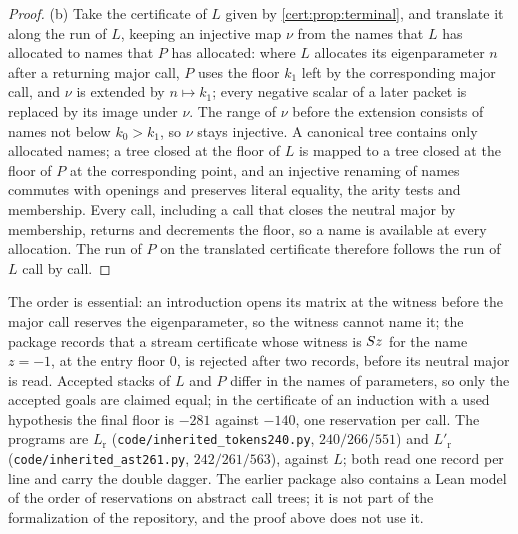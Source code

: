\begin{proof}
(b) Take the certificate of $L$ given by \cref{cert:prop:terminal}, and translate
it along the run of $L$, keeping an injective map $\nu$ from the names that $L$
has allocated to names that $P$ has allocated: where $L$ allocates its
eigenparameter $n$ after a returning major call, $P$ uses the floor $k_1$ left
by the corresponding major call, and $\nu$ is extended by $n\mapsto k_1$; every
negative scalar of a later packet is replaced by its image under $\nu$. The
range of $\nu$ before the extension consists of names not below $k_0>k_1$, so
$\nu$ stays injective. A canonical tree contains only allocated names; a tree
closed at the floor of $L$ is mapped to a tree closed at the floor of $P$ at the
corresponding point, and an injective renaming of names commutes with openings
and preserves literal equality, the arity tests and membership. Every call,
including a call that closes the neutral major by membership, returns and
decrements the floor, so a name is available at every allocation. The run of
$P$ on the translated certificate therefore follows the run of $L$ call by call.
\end{proof}

The order is essential: an introduction opens its matrix at the witness before
the major call reserves the eigenparameter, so the witness cannot name it; the
package records that a stream certificate whose witness is $S z$ for the name
$z=-1$, at the entry floor $0$, is rejected after two records, before its neutral
major is read. Accepted stacks of $L$ and $P$ differ in the
names of parameters, so only the accepted goals are claimed equal; in the
certificate of an induction with a used hypothesis the final floor is $-281$
against $-140$, one reservation per call. The programs are $L_{\mathrm r}$
(\texttt{code/inherited\_tokens240.py}, $240/266/551$) and $L'_{\mathrm r}$
(\texttt{code/inherited\_ast261.py}, $242/261/563$), against $L$; both read one
record per line and carry the double dagger. The earlier package also contains
a Lean model of the order of reservations on abstract call trees; it is not part
of the formalization of the repository, and the proof above does not use it.

